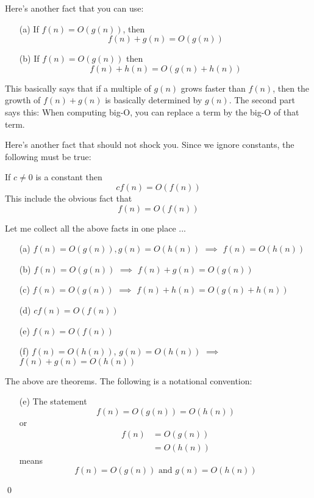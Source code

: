Here's another fact that you can use:
\begin{thm}\mbox{}
\begin{itemize}
\item[(a)] If $f(n) = O(g(n))$, then
\[
f(n) + g(n) = O(g(n))
\]
\item[(b)]
If $f(n) = O(g(n))$
then
\[
f(n) + h(n) = O(g(n) + h(n))
\]
\end{itemize}
\end{thm}

This basically says that if a multiple of 
$g(n)$ grows faster than $f(n)$, then
the growth of $f(n) + g(n)$ is basically determined by $g(n)$.
The second part says this: When computing big-O,
you can replace a term by the big-O of that term.

Here's another fact that should not shock you.
Since we ignore constants, the following must be true:

\begin{thm}
If $c \neq 0$ is a constant then
\[
cf(n) = O(f(n))
\]
This include the obvious fact that
\[
f(n) = O(f(n))
\]
\end{thm}

Let me collect all the above facts in one place ...

\newpage


\begin{thm} \mbox{}
\begin{itemize}
\item[(a)] $f(n) = O(g(n)), g(n) = O(h(n))$ $\implies$ $f(n) = O(h(n))$
\item[(b)] $f(n) = O(g(n))$ $\implies$ $f(n) + g(n) = O(g(n))$
\item[(c)] $f(n) = O(g(n))$ $\implies$ $f(n) + h(n) = O(g(n) + h(n))$
\item[(d)] $cf(n) = O(f(n))$ 
\item[(e)] $f(n) = O(f(n))$ 
\item[(f)] $f(n) = O(h(n))$, $g(n) = O(h(n))$ $\implies$
           $f(n) + g(n) = O(h(n))$ 
\end{itemize}
The above are theorems.
The following is a notational convention:
\begin{itemize}
\item[(e)] The statement
\[ 
f(n) = O(g(n)) = O(h(n))
\]
or
\begin{align*}
f(n) &= O(g(n)) \\
     &= O(h(n))
\end{align*}
means
\[
f(n) = O(g(n)) \text{ and } g(n) = O(h(n))
\]
\end{itemize}
\end{thm}
\qed

